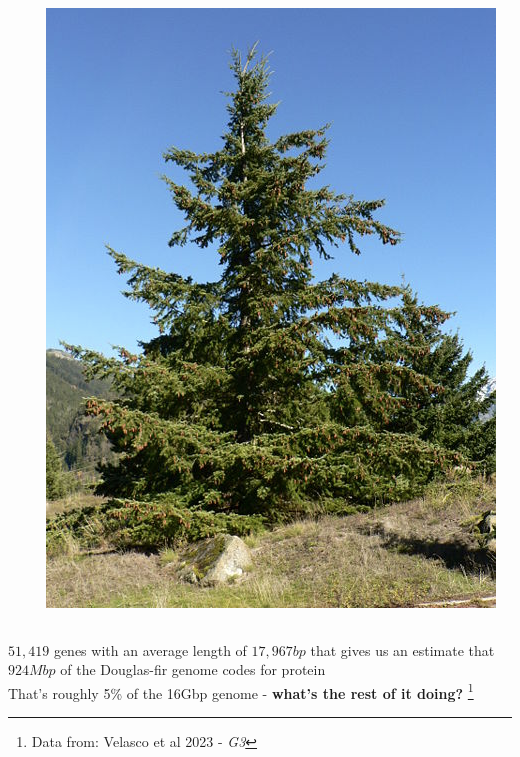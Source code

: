 \documentclass{beamer}
\newcommand\blfootnote[1]{%
	\begingroup
	\renewcommand\thefootnote{}\footnote{#1}%
	\addtocounter{footnote}{-1}%
	\endgroup
}
\begin{document}
\begin{frame}
\begin{columns}
\begin{column}{0.7\textwidth}
\begin{tabular}{r|c}
			\end{tabular}		
		\end{column}
		\begin{column}{0.3\textwidth}
			\centering	\includegraphics[keepaspectratio, width  = \textwidth]{img/doug-fir}
		\end{column}
	\end{columns} 
	\vspace{10pt}
	$51,419$ genes with an average length of $17,967bp$ that gives us an estimate that $924Mbp$ of the Douglas-fir genome codes for protein\\
	\vspace{10pt}
	That's roughly 5\% of the 16Gbp genome -\textbf{ what's the rest of it doing?}
	\blfootnote{Data from: Velasco et al 2023 - \textit{G3}}
\end{frame}
\end{document}
